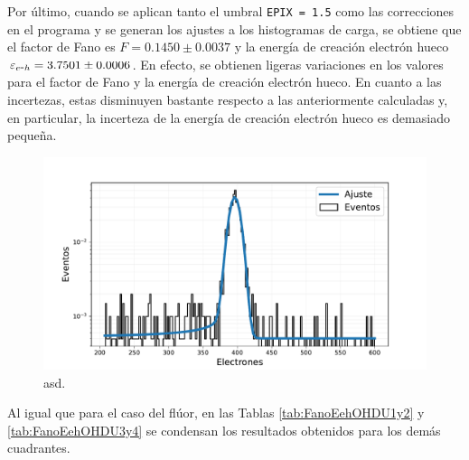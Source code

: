 Por último, cuando se aplican tanto el umbral \verb|EPIX = 1.5| como las correcciones en el programa y se generan los ajustes a los histogramas de carga, se obtiene que el factor de Fano es $F = 0.1450 \pm 0.0037$ y la energía de creación electrón hueco $\varepsilon_{e\mbox{-}h} = 3.7501 \pm 0.0006$. En efecto, se obtienen ligeras variaciones en los valores para el factor de Fano y la energía de creación electrón hueco. En cuanto a las incertezas, estas disminuyen bastante respecto a las anteriormente calculadas y, en particular, la incerteza de la energía de creación electrón hueco es demasiado pequeña.
\begin{figure}[H]
    \centering
        \includegraphics[scale=0.5]{Figs/HistFit_100c_EPIX15_OHDU1_Corr.pdf}
    \caption{\footnotesize{asd.}}
    \label{fig:Al_OHDU1_EPIX15_Corr}
\end{figure}
Al igual que para el caso del flúor, en las Tablas \ref{tab:FanoEehOHDU1y2} y \ref{tab:FanoEehOHDU3y4} se condensan los resultados obtenidos para los demás cuadrantes.

